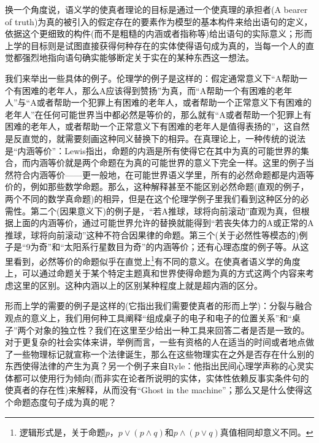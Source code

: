 \documentclass{article}
\begin{document}
换一个角度说，语义学的使真者理论的目标是通过一个使真理的承担者(A bearer of
truth)为真的被引入的假定存在的要素作为模型的基本构件来给出语句的定义，依据这个更细致的构件(而不是粗糙的内涵或者指称等)给出语句的实际意义；形而上学的目标则是试图直接获得何种存在的实体使得语句成为真的，当每一个人的直觉都强烈地指向语句确实能够断定关于实在的某种东西这一想法。

我们来举出一些具体的例子。伦理学的例子是这样的：假定通常意义下“A帮助一个有困难的老年人，那么A应该得到赞扬”为真，而“A帮助一个有困难的老年人”与“A或者帮助一个犯罪上有困难的老年人，或者帮助一个正常意义下有困难的老年人”在任何可能世界当中都必然是等价的，那么就有“A或者帮助一个犯罪上有困难的老年人，或者帮助一个正常意义下有困难的老年人是值得表扬的”，这自然是反直觉的，就需要刻画这种同义替换下的相异。在真理论上，一种传统的说法是“内涵等价”：Lewis指出，命题的内涵是所有使得它在其中为真的可能世界的集合，而内涵等价就是两个命题在为真的可能世界的意义下完全一样。这里的例子当然符合内涵等价——更一般地，在可能世界语义学里，所有的必然命题都是内涵等价的，例如那些数学命题。那么，这种解释甚至不能区别必然命题(直观的例子，两个不同的数学真命题)的相异，但是在这个伦理学例子里我们看到这种区分的必需性。第二个(因果意义下)的例子是，“若A推球，球将向前滚动”直观为真，但根据上面的内涵等价，通过可能世界允许的替换就能得到“若丧失体力的A或正常的A推球，球将向前滚动”这种不符合因果律的命题。第三个(关于必然性等模态的)例子是“9为奇”和“太阳系行星数目为奇”的内涵等价；还有心理态度的例子等。从这里看到，必然等价的命题似乎在直觉上\footnote{逻辑形式是，关于命题$p$，$p\lor(p\land q)$和$p\land(p \lor q)$真值相同却意义不同。}有不同的意义。在使真者语义学的角度上，可以通过命题关于某个特定主题真和世界使得命题为真的方式这两个内容来考虑这里的区别。这种内涵以上的区别某种程度上就是{\heiti 超内涵}的区分。

形而上学的需要的例子是这样的(它指出我们需要使真者的形而上学)：分裂与融合观点的意义上，我们用何种工具阐释“组成桌子的电子和电子的位置关系”和“桌子”两个对象的独立性？我们在这里至少给出一种工具来回答二者是否是一致的。对于更复杂的社会实体来讲，举例而言，一些有资格的人在适当的时间或者地点做了一些物理标记就宣称一个法律诞生，那么在这些物理实在之外是否存在什么别的东西使得法律的产生为真？另一个例子来自Ryle：他指出民间心理学声称的心灵实体都可以使用行为倾向(而非实在论者所说明的实体，实体性依赖反事实条件句的使真者的存在性)来解释，从而没有“Ghost in the machine”；那么又是什么使得这个命题态度句子成为真的呢？
\end{document}
